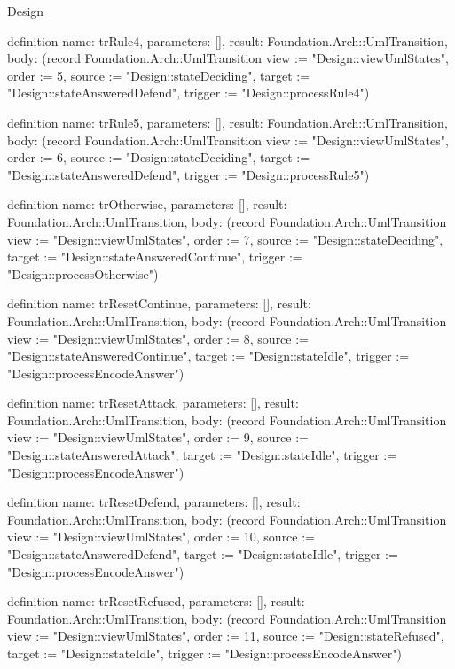 \begin{lexlean}{Design}
\begin{semanticmodule}
definition{
  name: trRule4,
  parameters: [],
  result: Foundation.Arch::UmlTransition,
  body: (record Foundation.Arch::UmlTransition {view := "Design::viewUmlStates", order := 5, source := "Design::stateDeciding", target := "Design::stateAnsweredDefend", trigger := "Design::processRule4"})
}

definition{
  name: trRule5,
  parameters: [],
  result: Foundation.Arch::UmlTransition,
  body: (record Foundation.Arch::UmlTransition {view := "Design::viewUmlStates", order := 6, source := "Design::stateDeciding", target := "Design::stateAnsweredDefend", trigger := "Design::processRule5"})
}

definition{
  name: trOtherwise,
  parameters: [],
  result: Foundation.Arch::UmlTransition,
  body: (record Foundation.Arch::UmlTransition {view := "Design::viewUmlStates", order := 7, source := "Design::stateDeciding", target := "Design::stateAnsweredContinue", trigger := "Design::processOtherwise"})
}

definition{
  name: trResetContinue,
  parameters: [],
  result: Foundation.Arch::UmlTransition,
  body: (record Foundation.Arch::UmlTransition {view := "Design::viewUmlStates", order := 8, source := "Design::stateAnsweredContinue", target := "Design::stateIdle", trigger := "Design::processEncodeAnswer"})
}

definition{
  name: trResetAttack,
  parameters: [],
  result: Foundation.Arch::UmlTransition,
  body: (record Foundation.Arch::UmlTransition {view := "Design::viewUmlStates", order := 9, source := "Design::stateAnsweredAttack", target := "Design::stateIdle", trigger := "Design::processEncodeAnswer"})
}

definition{
  name: trResetDefend,
  parameters: [],
  result: Foundation.Arch::UmlTransition,
  body: (record Foundation.Arch::UmlTransition {view := "Design::viewUmlStates", order := 10, source := "Design::stateAnsweredDefend", target := "Design::stateIdle", trigger := "Design::processEncodeAnswer"})
}

definition{
  name: trResetRefused,
  parameters: [],
  result: Foundation.Arch::UmlTransition,
  body: (record Foundation.Arch::UmlTransition {view := "Design::viewUmlStates", order := 11, source := "Design::stateRefused", target := "Design::stateIdle", trigger := "Design::processEncodeAnswer"})
}
\end{semanticmodule}
\end{lexlean}
